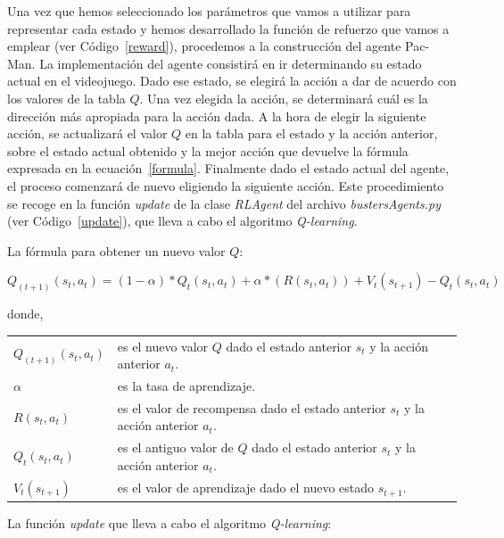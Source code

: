 \documentclass[11pt]{exam}
\makeatletter
\newenvironment{conditions}
{\par\vspace{\abovedisplayskip}\noindent\begin{tabular}{>{$}l<{$} @{${}\:{}$} l}}
	{\end{tabular}\par\vspace{\belowdisplayskip}}
\makeatother
\begin{document}
Una vez que hemos seleccionado los parámetros que vamos a utilizar para representar cada estado y hemos desarrollado la función de refuerzo que vamos a emplear (ver Código~\ref{reward}), procedemos a la construcción del agente Pac-Man. La implementación del agente consistirá en ir determinando su estado actual en el videojuego. Dado ese estado, se elegirá la acción a dar de acuerdo con los valores de la tabla $Q$. Una vez elegida la acción, se determinará cuál es la dirección más apropiada para la acción dada. A la hora de elegir la siguiente acción, se actualizará el valor $Q$ en la tabla para el estado y la acción anterior, sobre el estado actual obtenido y la mejor acción que devuelve la fórmula expresada en la ecuación~\ref{formula}. Finalmente dado el estado actual del agente, el proceso comenzará de nuevo eligiendo la siguiente acción. Este procedimiento se recoge en la función \textit{update} de la clase \textit{RLAgent} del archivo \textit{bustersAgents.py} (ver Código~\ref{update}), que lleva a cabo el algoritmo \textit{Q-learning}.
\vspace*{3mm}

La fórmula para obtener un nuevo valor $Q$:

\begin{equation}\label{formula}
	Q_{(t+1)}(s_{t},a_{t}) = (1-\alpha) * Q_{t}(s_{t},a_{t}) + \alpha * (R(s_{t},a_{t})) + V_{t}(s_{t+1}) - Q_{t}(s_{t},a_{t})
\end{equation}

donde,

\begin{conditions}
	Q_{(t+1)}(s_{t},a_{t}) & es el nuevo valor $Q$ dado el estado anterior $s_{t}$ y la acción anterior $a_{t}$. \\
	\alpha & es la tasa de aprendizaje. \\
	R(s_{t},a_{t}) & es el valor de recompensa dado el estado anterior $s_{t}$ y la acción anterior $a_{t}$.	\\
	Q_{t}(s_{t},a_{t}) & es el antiguo valor de $Q$ dado el estado anterior $s_{t}$ y la acción anterior $a_{t}$.	\\
	V_{t}(s_{t+1}) & es el valor de aprendizaje dado el nuevo estado $s_{t+1}$.
\end{conditions}
\vspace*{3mm}

La función \textit{update} que lleva a cabo el algoritmo \textit{Q-learning}:
\vspace*{2mm}
\end{document}
